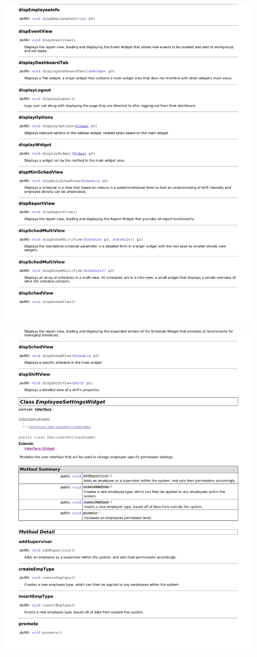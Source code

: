 \documentclass[letterpaper,12pt]{report}
\begin{document}
\includegraphics[scale=0.9,trim=20mm 30mm 25mm 10mm]{externals/di2.pdf}
\newpage
\includegraphics[scale=0.9,trim=20mm 30mm 25mm 5mm]{externals/di3.pdf}
\end{document}

